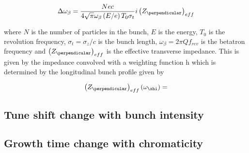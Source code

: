 \begin{equation}
\Delta{}\omega_{\beta} = \frac{Nec}{4\sqrt{\pi}\omega_{\beta} \left( E/e \right)T_{0}\sigma_{t}} i\left( Z_{\perpendicular} \right)_{eff}
\end{equation}

where $N$ is the number of particles in the bunch, $E$ is the energy, $T_{0}$ is the revolution frequency, $\sigma_{t} = \sigma_{z}/c$ is the bunch length, $\omega_{\beta} = 2\pi{}Q f_{rev}$ is the betatron frequency and $\left( Z_{\perpendicular} \right)_{eff}$ is the effective transverse impedance. This is given by the impedance convolved with a weighting function h which is determined by the longitudinal bunch profile given by

\begin{equation}
\left( Z_{\perpendicular} \right)_{eff} \left( \omega_{\xhi} \right) = 
\end{equation}

\subsection{Tune shift change with bunch intensity}

\subsection{Growth time change with chromaticity}